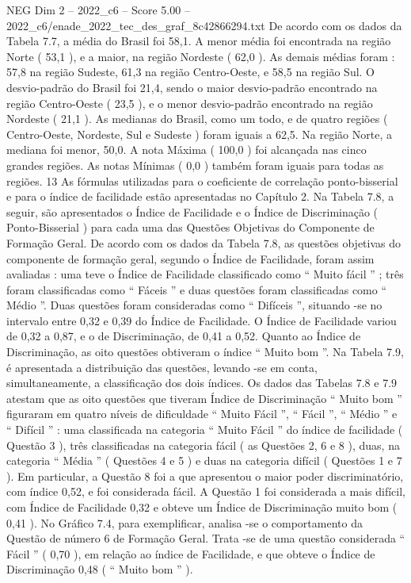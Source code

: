 \begin{textsample}{NEG Dim 2 – 2022\_c6 – Score 5.00 – 2022\_c6/enade\_2022\_tec\_des\_graf\_8c42866294.txt}
De acordo com os dados da Tabela 7.7, a média do Brasil foi 58,1.
A menor média foi encontrada na região Norte ( 53,1 ), e a maior, na região Nordeste ( 62,0 ).
As demais médias foram : 57,8 na região Sudeste, 61,3 na região Centro-Oeste, e 58,5 na região Sul.
O desvio-padrão do Brasil foi 21,4, sendo o maior desvio-padrão encontrado na região Centro-Oeste ( 23,5 ), e o menor desvio-padrão encontrado na região Nordeste ( 21,1 ).
As medianas do Brasil, como um todo, e de quatro regiões ( Centro-Oeste, Nordeste, Sul e Sudeste ) foram iguais a 62,5.
Na região Norte, a mediana foi menor, 50,0.
A nota Máxima ( 100,0 ) foi alcançada nas cinco grandes regiões.
As notas Mínimas ( 0,0 ) também foram iguais para todas as regiões. 13 As fórmulas utilizadas para o coeficiente de correlação ponto-bisserial e para o índice de facilidade estão apresentadas no Capítulo 2.
Na Tabela 7.8, a seguir, são apresentados o Índice de Facilidade e o Índice de Discriminação ( Ponto-Bisserial ) para cada uma das Questões Objetivas do Componente de Formação Geral.
De acordo com os dados da Tabela 7.8, as questões objetivas do componente de formação geral, segundo o Índice de Facilidade, foram assim avaliadas : uma teve o Índice de Facilidade classificado como “ Muito fácil ” ; três foram classificadas como “ Fáceis ” e duas questões foram classificadas como “ Médio ”.
Duas questões foram consideradas como “ Difíceis ”, situando -se no intervalo entre 0,32 e 0,39 do Índice de Facilidade.
O Índice de Facilidade variou de 0,32 a 0,87, e o de Discriminação, de 0,41 a 0,52.
Quanto ao Índice de Discriminação, as oito questões obtiveram o índice “ Muito bom ”.
Na Tabela 7.9, é apresentada a distribuição das questões, levando -se em conta, simultaneamente, a classificação dos dois índices.
Os dados das Tabelas 7.8 e 7.9 atestam que as oito questões que tiveram Índice de Discriminação “ Muito bom ” figuraram em quatro níveis de dificuldade “ Muito Fácil ”, “ Fácil ”, “ Médio ” e “ Difícil ” : uma classificada na categoria “ Muito Fácil ” do índice de facilidade ( Questão 3 ), três classificadas na categoria fácil ( as Questões 2, 6 e 8 ), duas, na categoria “ Média ” ( Questões 4 e 5 ) e duas na categoria difícil ( Questões 1 e 7 ).
Em particular, a Questão 8 foi a que apresentou o maior poder discriminatório, com índice 0,52, e foi considerada fácil.
A Questão 1 foi considerada a mais difícil, com Índice de Facilidade 0,32 e obteve um Índice de Discriminação muito bom ( 0,41 ).
No Gráfico 7.4, para exemplificar, analisa -se o comportamento da Questão de número 6 de Formação Geral.
Trata -se de uma questão considerada “ Fácil ” ( 0,70 ), em relação ao índice de Facilidade, e que obteve o Índice de Discriminação 0,48 ( “ Muito bom ” ).

\end{textsample}
